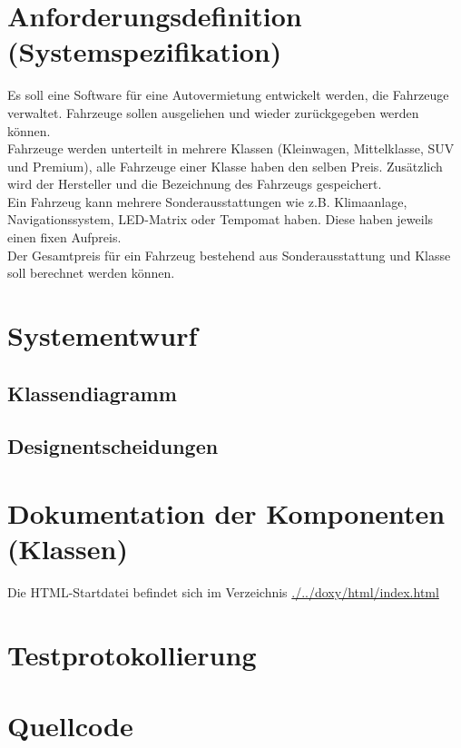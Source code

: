 \section{Anforderungsdefinition (Systemspezifikation)}
Es soll eine Software für eine Autovermietung entwickelt werden, die Fahrzeuge verwaltet. Fahrzeuge sollen ausgeliehen und wieder zurückgegeben werden können.\\

Fahrzeuge werden unterteilt in mehrere Klassen (Kleinwagen, Mittelklasse, SUV und Premium), alle Fahrzeuge einer Klasse haben den selben Preis. Zusätzlich wird der Hersteller und die Bezeichnung des Fahrzeugs gespeichert.\\ 

Ein Fahrzeug kann mehrere Sonderausstattungen wie z.B. Klimaanlage, Navigationssystem, LED-Matrix oder Tempomat haben. Diese haben jeweils einen fixen Aufpreis.\\

Der Gesamtpreis für ein Fahrzeug bestehend aus Sonderausstattung und Klasse soll berechnet werden können.\\
\section{Systementwurf}

\subsection{Klassendiagramm}

\subsection{Designentscheidungen}

\section{Dokumentation der Komponenten (Klassen)}

Die HTML-Startdatei befindet sich im Verzeichnis \href{run:./../doxy/html/index.html}{./../doxy/html/index.html}

\section{Testprotokollierung}

\section{Quellcode}

